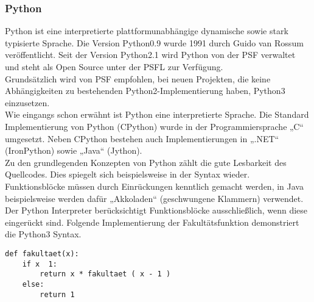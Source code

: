 \documentclass[../Bachelorarbeit.tex]{subfiles}
\begin{document}
\subsubsection*{Python}
\label{para:python}
Python ist eine interpretierte plattformunabhängige dynamische sowie stark typisierte 
Sprache. Die Version Python0.9 wurde 1991 durch Guido van Rossum veröffentlicht. Seit 
der Version Python2.1 wird Python von der \ac{PSF} verwaltet und 
steht als Open Source unter der \ac{PSFL} zur Verfügung.
\parencites[vgl.][]{python_typed_lang}[][]{python_history}[][]{python_faq}\\
Grundsätzlich wird von \ac{PSF} empfohlen, bei neuen Projekten, die keine 
Abhängigkeiten zu bestehenden Python2-Implementierung haben, Python3 einzusetzen. 
\parencite[vgl.][]{python2_or_python3} \\
Wie eingangs schon erwähnt ist Python eine interpretierte Sprache. Die Standard Implementierung von Python (CPython) wurde in der Programmiersprache „C“ umgesetzt. 
Neben CPython bestehen auch Implementierungen in „.NET“ (IronPython) sowie „Java“ 
(Jython).
\parencite[vgl.][]{about_python} \\
Zu den grundlegenden Konzepten von Python zählt die gute Lesbarkeit des Quellcodes. 
Dies spiegelt sich beispielsweise in der Syntax wieder. Funktionsblöcke müssen durch 
Einrückungen kenntlich gemacht werden, in Java beispielsweise werden dafür 
„Akkoladen“ (geschwungene Klammern) verwendet. Der Python Interpreter 
berücksichtigt Funktionsblöcke ausschließlich, wenn diese eingerückt sind. Folgende 
Implementierung der
Fakultätsfunktion demonstriert die Python3 Syntax. \\

\lstset{language=Python}
\begin{lstlisting}
def fakultaet(x):
	if x  1:
		return x * fakultaet ( x - 1 )
	else:
		return 1
\end{lstlisting}
\end{document}
